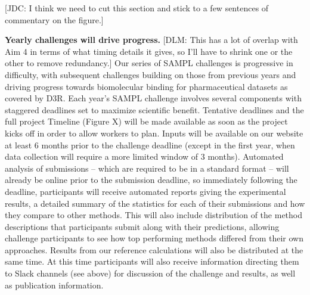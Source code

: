 \documentclass[11pt]{article}
\begin{document}
{\color{red}[JDC: I think we need to cut this section and stick to a few sentences of commentary on the figure.]}

\textbf{Yearly challenges will drive progress.}
{\color{red}[DLM: This has a lot of overlap with Aim 4 in terms of what timing details it gives, so I'll have to shrink one or the other to remove redundancy.]}
Our series of SAMPL challenges is progressive in difficulty, with subsequent challenges building on those from previous years and driving progress towards biomolecular binding for pharmaceutical datasets as covered by D3R.
Each year's SAMPL challenge involves several components with staggered deadlines set to maximize scientific benefit. 
Tentative deadlines and the full project Timeline (Figure X) will be made available as soon as the project kicks off in order to allow workers to plan.
Inputs will be available on our website at least 6 months prior to the challenge deadline (except in the first year, when data collection will require a more limited window of 3 months).
Automated analysis of submissions -- which are required to be in a standard format -- will already be online prior to the submission deadline, so immediately following the deadline, participants will receive automated reports giving the experimental results, a detailed summary of the statistics for each of their submissions and how they compare to other methods. 
This will also include distribution of the method descriptions that participants submit along with their predictions, allowing challenge participants to see how top performing methods differed from their own approaches.
Results from our reference calculations will also be distributed at the same time.
At this time participants will also receive information directing them to Slack channels (see above) for discussion of the challenge and results, as well as publication information.
\end{document}
